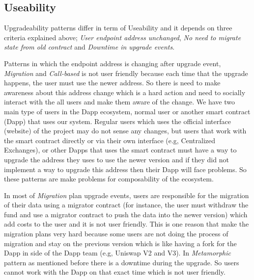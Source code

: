 \subsection{Useability}
Upgradeability patterns differ in term of Useability and it depends on three criteria explained above; \textit{User endpoint address unchanged}, \textit{No need to migrate state from old contract} and \textit{Downtime in upgrade events}.

Patterns in which the endpoint address is changing after upgrade event, \textit{Migration} and \textit{Call-based} is not user friendly because each time that the upgrade happens, the user must use the newer address. So there is need to make awareness about this address change which is a hard action and need to socially interact with the all users and make them aware of the change. We have two main type of users in the Dapp ecosystem, normal user or another smart contract (Dapp) that uses our system. Regular users which uses the official interface (website) of the project may do not sense any changes, but users that work with the smart contract directly or via their own interface (e.g, Centralized Exchanges), or other Dapps that uses the smart contract must have a way to upgrade the address they uses to use the newer version and if they did not implement a way to upgrade this address then their Dapp will face problems. So these patterns are make problems for composability of the ecosystem.

In most of \textit{Migration} plan upgrade events, users are responsible for the migration of their data using a migrator contract (for instance, the user must withdraw the fund and use a migrator contract to push the data into the newer version) which add costs to the user and it is not user friendly. This is one reason that make the migration plans very hard because some users are not doing the process of migration and stay on the previous version which is like having a fork for the Dapp in side of the Dapp team (e.g, Uniswap V2 and V3).
In \textit{Metamorphic} pattern as mentioned before there is a downtime during the upgrade. So users cannot work with the Dapp on that exact time which is not user friendly.



